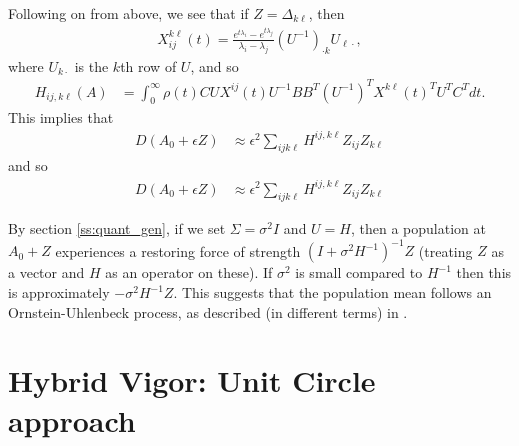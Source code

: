 \documentclass{article}
\newcommand{\1}{\mathbbm{1}}
\begin{document}
Following on from above, we see that if $Z=\Delta_{k \ell}$, then
\begin{equation}
  \begin{aligned}
      X_{ij}^{k\ell}(t) = 
      \frac{ e^{t \lambda_i} - e^{t \lambda_j} }{ \lambda_i - \lambda_j } 
      (U^{-1})_{\cdot k} U_{\ell \cdot},
  \end{aligned}
\end{equation}
where $U_{k \cdot}$ is the $k$th row of $U$,
and so
\begin{equation}
    \begin{aligned}
        H_{ij, k\ell}(A)
        &=
        \int_0^\infty
            \rho(t) C U X^{ij}(t) U^{-1} B B^T (U^{-1})^T X^{k\ell}(t)^T U^T C^T
        dt .
    \end{aligned}
\end{equation}
This implies that
\begin{equation}
    \begin{aligned}
        D(A_0+\epsilon Z)
        &\approx \epsilon^2\sum_{ijk\ell} H^{ij,k\ell} Z_{ij} Z_{k\ell} 
    \end{aligned}
\end{equation}
and so
\begin{equation}
    \begin{aligned}
        D(A_0+\epsilon Z)
        &\approx \epsilon^2\sum_{ijk\ell} H^{ij,k\ell} Z_{ij} Z_{k\ell} 
    \end{aligned}
\end{equation}

By section \ref{ss:quant_gen},
if we set $\Sigma=\sigma^2 I$ and $U=H$,
then a population at $A_0+Z$ experiences a restoring force of strength
$(I + \sigma^2 H^{-1})^{-1} Z$ (treating $Z$ as a vector and $H$ as an operator on these).
If $\sigma^2$ is small compared to $H^{-1}$
then this is approximately $-\sigma^2 H^{-1} Z$.
This suggests that the population mean follows an Ornstein-Uhlenbeck process,
as described (in different terms) in \citet{hansen1996translating}.

\section{Hybrid Vigor: Unit Circle approach}
\end{document}
